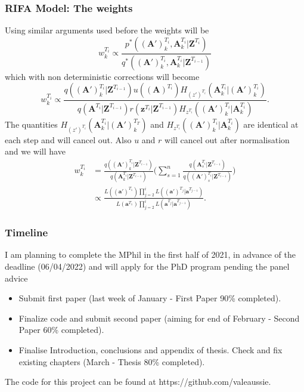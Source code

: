 \documentclass[9pt, xcolor={dvipsnames,svgnames,table}]{beamer}
\begin{document}
\begin{frame}
    \frametitle{RIFA Model: The weights}
    Using similar arguments used before the weights will be
    \begin{equation*}
        w^{T_i}_k \propto \frac{p^*(\bm{(A')}^{T_i}_k, \bm{A}^{T_i}_k | \bm{Z}^{T_i})} {q^*(\bm{(A')}^{T_i}_k, \bm{A}^{T_i}_k | \bm{Z}^{T_{i-1}})}
    \end{equation*}
    which with non deterministic corrections will become
    \begin{equation*}
        w^{T_i}_k \propto \frac{q(\bm{(A')}^{T_i}_k | \bm{Z}^{T_{i-1}}) u(\bm{(A)}^{T_i}) H_{(z')^{T_i}} (\bm{A}^{T_i}_k | \bm{(A')}^{T_i}_k)}{q(\bm{A}^{T_i} | \bm{Z}^{T_{i-1}}) r(\bm{z}^{T_i}| \bm{Z}^{T_{i-1}})  H_{z^{T_i}} (\bm{(A')}^{T_i}_k | \bm{A}^{T_i}_k)}.
    \end{equation*}
    The quantities $H_{(z')^{T_i}} (\bm{A}^{T_i}_k | \bm{(A')}^{T_T}_k)$ and $H_{z^{T_i}} (\bm{(A')}^{T_i}_k | \bm{A}^{T_i}_k)$ are identical at each step and will cancel out. Also $u$ and $r$ will cancel out after normalisation and we will have
    \begin{equation*}
        \begin{aligned}
            w^{T_i}_k & = \frac{q(\bm{(A')}^{T_i}_k | \bm{Z}^{T_{i-1}})}{q(\bm{A}^{T_i}_k | \bm{Z}^{T_{i-1}})} \Bigg( \sum_{s=1}^n \frac{q(\bm{A}^{T_i}_s | \bm{Z}^{T_{i-1}})}{q(\bm{(A')}^{T_i}_s | \bm{Z}^{T_{i-1}})} \Bigg)\\
            & \propto \frac{L((\bm{a}')^{T_1})\prod_{j=2}^{i} L((\bm{a}')^{T_j} | \bm{a}^{T_{j-1}})}{L(\bm{a}^{T_1})\prod_{j=2}^{i} L(\bm{a}^{T_j} | \bm{a}^{T_{j-1}})}.
        \end{aligned}
    \end{equation*}
\end{frame}






\begin{frame}
\frametitle{Timeline}
    I am planning to complete the MPhil in the first half of 2021, in advance of the deadline (06/04/2022) and will apply for the PhD program pending the panel advice
    \begin{itemize}
    \setlength\itemsep{1em}
        \item Submit first paper (last week of January - First Paper 90\% completed).
        \item Finalize code and submit second paper (aiming for end of February - Second Paper 60\% completed).
        \item Finalise Introduction, conclusions and appendix of thesis. Check and fix existing chapters (March - Thesis 80\% completed).
    \end{itemize}
    The code for this project can be found at https://github.com/valeaussie.
\end{frame}
\end{document}
